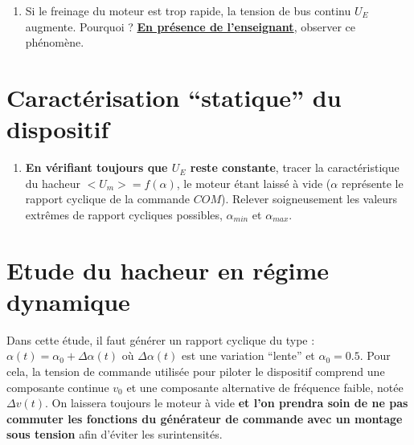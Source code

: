 \begin{enumerate}
Le montage étant assez ``volumineux'' à réaliser, il faudra prendre soin de câbler les différents blocs entre eux de manière aisément vérifiable. Les différents appareils de mesure devront être lisibles et l’oscilloscope sera aussi éloigné que possible des connexions de puissance.

\item Si le freinage du moteur est trop rapide, la tension de bus continu $U_E$ augmente. Pourquoi ? \underline{\textbf{En présence de l'enseignant}}, observer ce phénomène.
\end{enumerate}

\section{Caractérisation ``statique'' du dispositif}

\begin{enumerate}[label={}]
\item \textbf{En vérifiant toujours que $U_E$ reste constante}, tracer la caractéristique du hacheur $<U_m>=f(\alpha)$, le moteur étant laissé à vide ($\alpha$ représente le rapport cyclique de la commande $COM$). Relever soigneusement les valeurs extrêmes de rapport cycliques possibles, $\alpha_{min}$ et $\alpha_{max}$.

\end{enumerate}

\section{Etude du hacheur en régime dynamique}

Dans cette étude, il faut générer un rapport cyclique du type : $\alpha(t) = \alpha_0 + \Delta\alpha(t)$ où $\Delta\alpha(t)$ est une variation ``lente'' et $\alpha_0 = 0.5$. Pour cela, la tension de commande utilisée pour piloter le dispositif comprend une composante continue $v_0$ et une composante alternative de fréquence faible, notée $\Delta v(t)$. On laissera toujours le moteur à vide \textbf{et l’on prendra soin de ne pas commuter les fonctions du générateur de commande avec un montage sous tension} afin d’éviter les surintensités.

